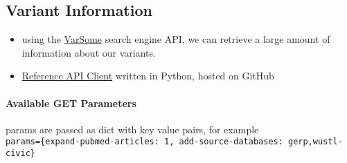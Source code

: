 \documentclass[11pt]{article}
\providecommand{\tightlist}{%
      \setlength{\itemsep}{0pt}\setlength{\parskip}{0pt}}
\begin{document}
    \subsection{Variant Information}\label{variant-information}

\begin{itemize}
\tightlist
\item
  using the \href{https://api.varsome.com/}{VarSome} search engine API,
  we can retrieve a large amount of information about our variants.
\item
  \href{https://github.com/saphetor/variant-api-client-python}{Reference
  API Client} written in Python, hosted on GitHub
\end{itemize}

    \paragraph{Available GET Parameters}\label{available-get-parameters}

params are passed as dict with key value pairs, for example\\
\texttt{params=\{\textquotesingle{}expand-pubmed-articles\textquotesingle{}:\ 1,\ \textquotesingle{}add-source-databases\textquotesingle{}:\ \textquotesingle{}gerp,wustl-civic\textquotesingle{}\}}
\end{document}

